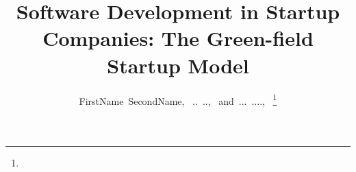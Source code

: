\documentclass[10pt,journal,letterpaper,compsoc]{IEEEtran}
\begin{document}
%
\title{Software Development in Startup Companies: The Green-field Startup Model}
%
%
%
%

\author{FirstName~SecondName,~
        ..~..,~
        and~...~....,~%
\thanks{}}

%
%
\end{document}
